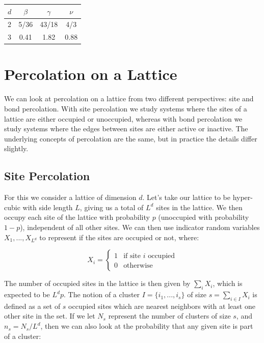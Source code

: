 \begin{center}
  \begin{tabular}{ | l | c | c | c | }
    \hline
    $d$ & $\beta$ & $\gamma$ & $\nu$ \\ \hline
    2 & 5/36 & 43/18 & 4/3 \\ \hline
    3 & 0.41 & 1.82 & 0.88 \\
    \hline
  \end{tabular}
\end{center}



\section{Percolation on a Lattice}
We can look at percolation on a lattice from two different perspectives: site and bond percolation.
With site percolation we study systems where the sites of a lattice are either occupied or unoccupied, whereas with bond percolation we study systems where the edges between sites are either active or inactive.
The underlying concepts of percolation are the same, but in practice the details differ slightly.



\subsection{Site Percolation}
For this we consider a lattice of dimension $d$.
Let's take our lattice to be hyper-cubic with side length $L$, giving us a total of $L^d$ sites in the lattice.
We then occupy each site of the lattice with probability $p$ (unoccupied with probability $1 - p$), independent of all other sites.
We can then use indicator random variables $X_1, ..., X_{L^d}$ to represent if the sites are occupied or not, where:

\[
X_i =
\begin{cases}
	1 & \text{if site } i \text{ occupied} \\
	0 & \text{otherwise}
\end{cases}
\]

The number of occupied sites in the lattice is then given by $\sum_i X_i$, which is expected to be $L^d p$.
The notion of a cluster $I = \{i_1, ..., i_s\}$ of size $s = \sum_{i \in I} X_i$ is defined as a set of $s$ occupied sites which are nearest neighbors with at least one other site in the set.
If we let $N_s$ represent the number of clusters of size $s$, and $n_s = N_s / L^d$, then we can also look at the probability that any given site is part of a cluster:


